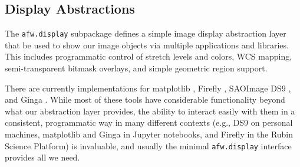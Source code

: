 \subsection{Display Abstractions}
\label{sec:display}

The \texttt{afw.display} subpackage defines a simple image display abstraction layer that be used to show our image objects via multiple applications and libraries.
This includes programmatic control of stretch levels and colors, WCS mapping, semi-transparent bitmask overlays, and simple geometric region support.

There are currently implementations for matplotlib \citep{2007CSE.....9...90H}, Firefly \citep{2020ASPC..527..243R}, SAOImage DS9 \citep{2003ASPC..295..489J}, and Ginga \citep[][via Astrowidgets]{2013ASPC..475..319J}.
While most of these tools have considerable functionality beyond what our abstraction layer provides, the ability to interact easily with them in a consistent, programmatic way in many different contexts (e.g., DS9 on personal machines, matplotlib and Ginga in Jupyter notebooks, and Firefly in the Rubin Science Platform) is invaluable, and usually the minimal \texttt{afw.display} interface provides all we need.
